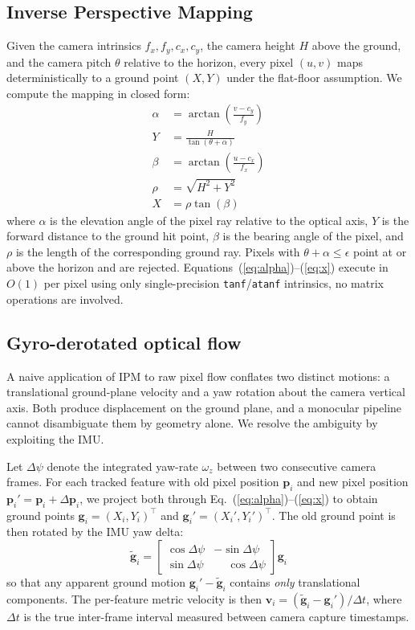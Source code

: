 \documentclass[conference]{IEEEtran}
\begin{document}
\subsection{Inverse Perspective Mapping}
\label{sec:ipm}
Given the camera intrinsics $f_x, f_y, c_x, c_y$, the camera height
$H$ above the ground, and the camera pitch $\theta$ relative to
the horizon, every pixel $(u, v)$ maps deterministically to a ground
point $(X, Y)$ under the flat-floor assumption.  We compute the
mapping in closed form:
\begin{align}
\alpha &= \arctan\!\left(\frac{v - c_y}{f_y}\right) \label{eq:alpha}\\
Y &= \frac{H}{\tan(\theta + \alpha)} \label{eq:y}\\
\beta &= \arctan\!\left(\frac{u - c_x}{f_x}\right) \label{eq:beta}\\
\rho &= \sqrt{H^{2} + Y^{2}} \label{eq:rho}\\
X &= \rho \tan(\beta) \label{eq:x}
\end{align}
where $\alpha$ is the elevation angle of the pixel ray relative to
the optical axis, $Y$ is the forward distance to the ground hit
point, $\beta$ is the bearing angle of the pixel, and $\rho$ is the
length of the corresponding ground ray.  Pixels with
$\theta + \alpha \le \epsilon$ point at or above the horizon and are
rejected.  Equations~(\ref{eq:alpha})--(\ref{eq:x}) execute in $O(1)$
per pixel using only single-precision \texttt{tanf}/\texttt{atanf}
intrinsics, no matrix operations are involved.

\subsection{Gyro-derotated optical flow}
\label{sec:derot}
A naive application of IPM to raw pixel flow conflates two distinct
motions: a translational ground-plane velocity and a yaw rotation
about the camera vertical axis.  Both produce displacement on the
ground plane, and a monocular pipeline cannot disambiguate them by
geometry alone.  We resolve the ambiguity by exploiting the IMU.

Let $\Delta\psi$ denote the integrated yaw-rate $\omega_z$ between
two consecutive camera frames.  For each tracked feature
with old pixel position $\mathbf{p}_i$ and new pixel position
$\mathbf{p}_i' = \mathbf{p}_i + \Delta\mathbf{p}_i$, we project both
through Eq.~(\ref{eq:alpha})--(\ref{eq:x}) to obtain
ground points $\mathbf{g}_i = (X_i, Y_i)^\top$ and
$\mathbf{g}_i' = (X_i', Y_i')^\top$.  The old ground point is then
rotated by the IMU yaw delta:
\begin{equation}
\tilde{\mathbf{g}}_i =
\begin{bmatrix}
\cos\Delta\psi & -\sin\Delta\psi \\
\sin\Delta\psi & \phantom{-}\cos\Delta\psi
\end{bmatrix} \mathbf{g}_i
\end{equation}
so that any apparent ground motion $\mathbf{g}_i' - \tilde{\mathbf{g}}_i$
contains \emph{only} translational components.  The per-feature metric
velocity is then $\mathbf{v}_i = (\tilde{\mathbf{g}}_i - \mathbf{g}_i') / \Delta t$,
where $\Delta t$ is the true inter-frame interval measured between
camera capture timestamps.
\end{document}
